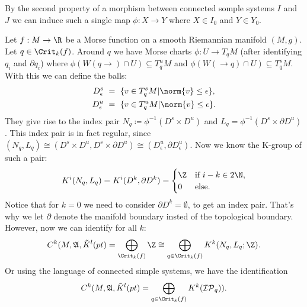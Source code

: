 \begin{remark}
	By the second property of a morphism between connected somple systems $I$ and $J$ we can induce such a single map $\phi:X\to Y$ where $X\in I_0$ and $Y\in Y_0$. 
\end{remark}

\begin{remark} \label{ex: Critical points as isolated compact invariant subsets}
	Let ${f:M\to \R}$ be a Morse function on a smooth Riemannian manifold $(M,g)$. Let $q\in \Crit_k(f)$. Around $q$ we have Morse charts $\phi:U \to T_qM$ (after identifying $q_i$ and $\partial q_i$) where  ${\phi(W(q\to)\cap U)\subseteq T_q^{u}M}$ and ${\phi(W(\to q)\cap U)\subseteq T_q^{s}M}$. With this we can define the balls:
	\begin{align*}
		D^{s}_\epsilon &~=~\{v\in T_q^{s}M | \norm{v}\leq \epsilon \}, \\
		D^{u}_\epsilon &~=~\{v\in T_q^{u }M | \norm{v}\leq \epsilon \}. 
	\end{align*} They give rise to the index pair $N_q\coloneq\phi^{-1}( D^{s }\times  D^{u })$ and $L_q=\phi^{-1}( D^{ s}\times \partial D^{u})$. This index pair is in fact regular, since $(N_q,L_q)\cong  (D^{ s}\times  D^{u }, D^{s}\times \partial D^{u}) \cong (D^{u}_{\epsilon},\partial D^{u}_{\epsilon} )$. Now we know the K-group of such a pair:
	\begin{align} \label{eq: homology of indexx pair of critical point}
		K^i(N_q,L_q)=K^i(D^{k},\partial D^{k})=\begin{cases}
			\Z & \text{if } i-k\in 2\N,\\
			0& \text{else. }
		\end{cases}
	\end{align}
	Notice that for $k=0$ we need to consider $\partial D^k=\emptyset$, to get an index pair. That's why we let $\partial$ denote the manifold boundary insted of the topological boundary. However, now we can identify for all $k$: \begin{equation} \label{ kritical points as direct sum of homology groups}
		C^{k}(M,\mathfrak{A},\tilde{K}^{l}(pt)=\bigoplus_{ \Crit_k(f)} \Z \cong \bigoplus_{q\in \Crit_k(f)} K^k(N_q,L_q;\Z).
	\end{equation}
	Or using the language of connected simple systems, we have the identification 
	\begin{equation} 
		C^{k}(M,\mathfrak{A},\tilde{K}^{l}(pt)= \bigoplus_{q\in \Crit_k(f)} K^k(\mathcal{IP}_q)).
	\end{equation}
\end{remark}

